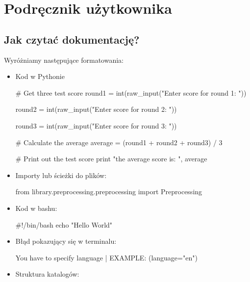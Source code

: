 \newpage
\section{Podręcznik użytkownika}
\subsection{Jak czytać dokumentację?}

Wyróżniamy następujące formatowania:

\begin{itemize}
\item Kod w Pythonie

\begin{python}
# Get three test score
round1 = int(raw_input("Enter score for round 1: "))

round2 = int(raw_input("Enter score for round 2: "))

round3 = int(raw_input("Enter score for round 3: "))
   
# Calculate the average
average = (round1 + round2 + round3) / 3

# Print out the test score
print "the average score is: ", average 

\end{python}

\item Importy lub ścieżki do plików:
\begin{import}
from library.preprocessing.preprocessing import Preprocessing
\end{import}

\item Kod w bashu:

\begin{bash}
#!/bin/bash
echo "Hello World"
\end{bash}

\item Błąd pokazujący się w terminalu:
\begin{consolerror}
You have to specify language | EXAMPLE: (language="en")
\end{consolerror}



\item Struktura katalogów:
\myspace
{}

\end{itemize}